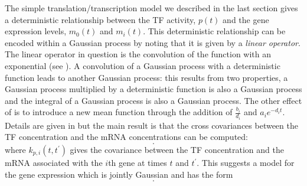 \documentclass{article}
\begin{document}
The simple translation/transcription model we described in the last section gives a deterministic relationship between the TF activity, $p(t)$ and the gene expression levels, $m_0(t)$ and $m_i(t)$. This deterministic relationship can be encoded within a Gaussian process by noting that it is given by a \emph{linear operator}. The linear operator in question is the convolution of the function with an exponential (see ). A convolution of a Gaussian process with a deterministic function leads to another Gaussian process: this results from two properties, a Gaussian process multiplied by a deterministic function is also a Gaussian process and the integral of a Gaussian process is also a Gaussian process. The other effect of  is to introduce a new mean function through the addition of $\frac{b_i}{d_i}$ and $a_i e^{-d_i t}$. Details are given in \cite{Lawrence:,Gao:,Honkela:} but the main result is that the cross covariances between the TF concentration and the mRNA concentrations can be computed:
\[
.
\]
where $k_{p,i}(t, t^\prime)$ gives the covariance between the TF concentration and the mRNA associated with the $i$th gene at times $t$ and $t^\prime$. This suggests a model for the gene expression which is jointly Gaussian and has the form
\[
.
\]



\end{document}
